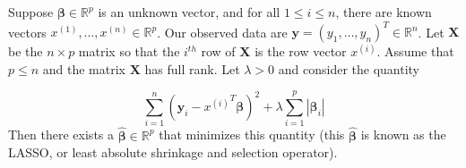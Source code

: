 \begin{proposition} Suppose $\boldsymbol{\beta}\in\mathbb{R}^{p}$ is an unknown vector, and for all $1\leq i\leq n$, there are known vectors $x^{(1)},\ldots,x^{(n)}\in\mathbb{R}^{p}$.  Our observed data are $\boldsymbol{y} = (y_{1},\ldots,y_{n})^T\in\mathbb{R}^n$. Let $\boldsymbol{X}$ be the $n\times p$ matrix so that the $i^{th}$ row of $\boldsymbol{X}$ is the row vector $x^{(i)}$.  Assume that $p\leq n$ and the matrix $\boldsymbol{X}$ has full rank. Let $\lambda>0$ and consider the quantity

\begin{equation}\label{math541a.hw7.3.eq2}
\sum_{i=1}^{n}\left(\boldsymbol{y}_{i}-{x^{(i)}}^T\boldsymbol{\beta} \right )^{2}+\lambda\sum_{i=1}^{p} | \boldsymbol{\beta}_{i}|
\end{equation}
Then there exists a $\hat{\boldsymbol{\beta}}\in\mathbb{R}^{p}$ that minimizes this quantity (this $\hat{\boldsymbol{\beta}}$ is known as the LASSO, or least absolute shrinkage and selection operator).  

\end{proposition}

